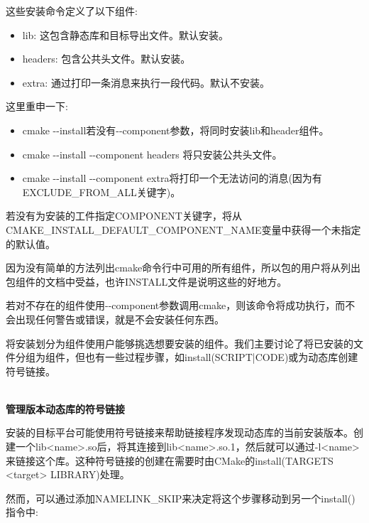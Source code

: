 这些安装命令定义了以下组件:

\begin{itemize}
\item 
lib: 这包含静态库和目标导出文件。默认安装。

\item 
headers: 包含公共头文件。默认安装。

\item 
extra: 通过打印一条消息来执行一段代码。默认不安装。
\end{itemize}

这里重申一下:

\begin{itemize}
\item 
cmake -{}-install若没有-{}-component参数，将同时安装lib和header组件。

\item 
cmake -{}-install -{}-component headers 将只安装公共头文件。

\item 
cmake -{}-install -{}-component extra将打印一个无法访问的消息(因为有EXCLUDE\_FROM\_ALL关键字)。
\end{itemize}

若没有为安装的工件指定COMPONENT关键字，将从CMAKE\_INSTALL\_DEFAULT\_COMPONENT\_NAME变量中获得一个未指定的默认值。

\begin{tcolorbox}[colback=blue!5!white,colframe=blue!75!black,title=Note]
因为没有简单的方法列出cmake命令行中可用的所有组件，所以包的用户将从列出包组件的文档中受益，也许INSTALL文件是说明这些的好地方。
\end{tcolorbox}

若对不存在的组件使用-{}-component参数调用cmake，则该命令将成功执行，而不会出现任何警告或错误，就是不会安装任何东西。

将安装划分为组件使用户能够挑选想要安装的组件。我们主要讨论了将已安装的文件分组为组件，但也有一些过程步骤，如install(SCRIPT|CODE)或为动态库创建符号链接。

\hspace*{\fill} \\ %
\noindent
\textbf{管理版本动态库的符号链接}

安装的目标平台可能使用符号链接来帮助链接程序发现动态库的当前安装版本。创建一个lib<name>.so后，将其连接到lib<name>.so.1，然后就可以通过-l<name>来链接这个库。这种符号链接的创建在需要时由CMake的install(TARGETS <target> LIBRARY)处理。

然而，可以通过添加NAMELINK\_SKIP来决定将这个步骤移动到另一个install()指令中:


